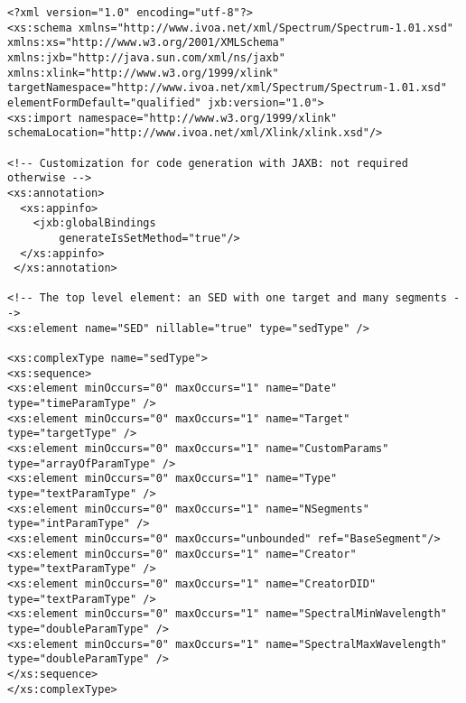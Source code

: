 { \footnotesize
\begin{flushleft}

\begin{fmppage}


\begin{verbatim}
<?xml version="1.0" encoding="utf-8"?>
<xs:schema xmlns="http://www.ivoa.net/xml/Spectrum/Spectrum-1.01.xsd"
xmlns:xs="http://www.w3.org/2001/XMLSchema"
xmlns:jxb="http://java.sun.com/xml/ns/jaxb"
xmlns:xlink="http://www.w3.org/1999/xlink"
targetNamespace="http://www.ivoa.net/xml/Spectrum/Spectrum-1.01.xsd"
elementFormDefault="qualified" jxb:version="1.0">
<xs:import namespace="http://www.w3.org/1999/xlink" schemaLocation="http://www.ivoa.net/xml/Xlink/xlink.xsd"/>

<!-- Customization for code generation with JAXB: not required otherwise -->
<xs:annotation>
  <xs:appinfo>
    <jxb:globalBindings
        generateIsSetMethod="true"/>
  </xs:appinfo>
 </xs:annotation>

<!-- The top level element: an SED with one target and many segments -->
<xs:element name="SED" nillable="true" type="sedType" />

<xs:complexType name="sedType">
<xs:sequence>
<xs:element minOccurs="0" maxOccurs="1" name="Date" type="timeParamType" />
<xs:element minOccurs="0" maxOccurs="1" name="Target" type="targetType" />
<xs:element minOccurs="0" maxOccurs="1" name="CustomParams" type="arrayOfParamType" />
<xs:element minOccurs="0" maxOccurs="1" name="Type" type="textParamType" />
<xs:element minOccurs="0" maxOccurs="1" name="NSegments" type="intParamType" />
<xs:element minOccurs="0" maxOccurs="unbounded" ref="BaseSegment"/>
<xs:element minOccurs="0" maxOccurs="1" name="Creator" type="textParamType" />
<xs:element minOccurs="0" maxOccurs="1" name="CreatorDID" type="textParamType" />
<xs:element minOccurs="0" maxOccurs="1" name="SpectralMinWavelength" type="doubleParamType" />
<xs:element minOccurs="0" maxOccurs="1" name="SpectralMaxWavelength" type="doubleParamType" />
</xs:sequence>
</xs:complexType>

\end{verbatim}
\end{fmppage}

\begin{fmppage}
\begin{verbatim}


\end{verbatim}
\end{fmppage}
\end{flushleft}}
